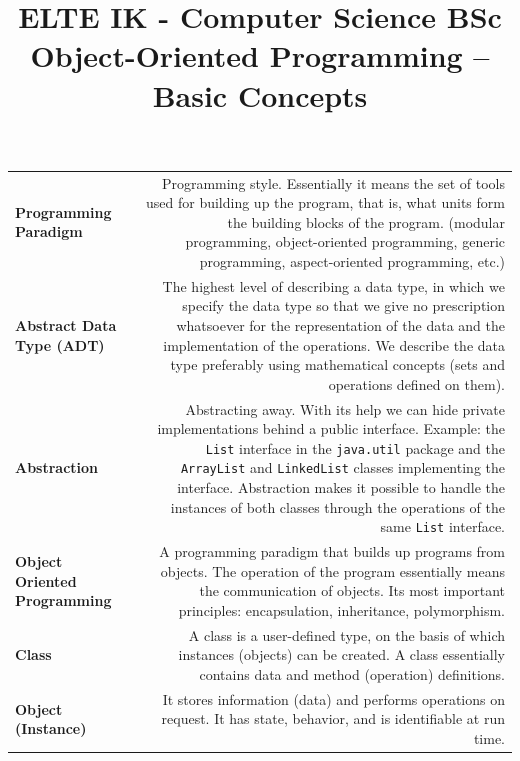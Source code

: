 \documentclass[margin=0px]{article}
\title{\textbf{{\Large ELTE IK - Computer Science BSc} \vspace{0.2cm} \\ {\huge Object-Oriented Programming -- Basic Concepts}}}
\author{}
\date{}
\begin{document}
\maketitle

\begin{center}
\end{center}

\noindent
\begin{longtable}{L R}
\textbf{Programming Paradigm} &
Programming style. Essentially it means the set of tools used for building up the program, that is, what units form the building blocks of the program. (modular programming, object-oriented programming, generic programming, aspect-oriented programming, etc.) \\[4pt]

\textbf{Abstract Data Type (ADT)} &
The highest level of describing a data type, in which we specify the data type so that we give no prescription whatsoever for the representation of the data and the implementation of the operations. We describe the data type preferably using mathematical concepts (sets and operations defined on them). \\[4pt]

\textbf{Abstraction} &
Abstracting away. With its help we can hide private implementations behind a public interface. Example: the \texttt{List} interface in the \texttt{java.util} package and the \texttt{ArrayList} and \texttt{LinkedList} classes implementing the interface. Abstraction makes it possible to handle the instances of both classes through the operations of the same \texttt{List} interface. \\[4pt]

\textbf{Object Oriented Programming} &
A programming paradigm that builds up programs from objects. The operation of the program essentially means the communication of objects. Its most important principles: encapsulation, inheritance, polymorphism. \\[4pt]

\textbf{Class} &
A class is a user-defined type, on the basis of which instances (objects) can be created. A class essentially contains data and method (operation) definitions. \\[4pt]

\textbf{Object (Instance)} &
It stores information (data) and performs operations on request. It has state, behavior, and is identifiable at run time. \\[4pt]


\end{longtable}
\end{document}
